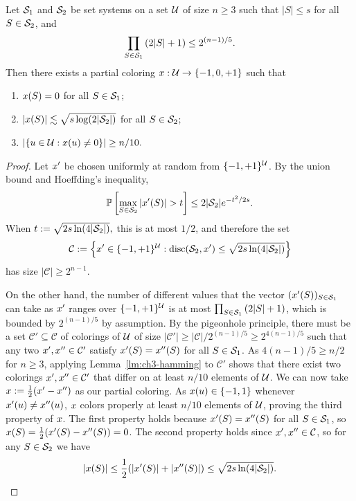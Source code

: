 \begin{lemma}\label{lm:ch3-beck}
  Let $\mathcal{S}_1$ and $\mathcal{S}_2$ be set systems on a set $\mathcal{U}$ of size $n
  \ge 3$
  such that  $|S| \le s$ for all $S \in \mathcal{S}_2$, and
  \[
  \prod_{S \in \mathcal{S}_1}{(2|S| + 1)} \le 2^{(n-1)/5}.
  \]
  Then there exists a {partial coloring} $x:\mathcal{U} \to \{-1, 0, +1\}$
  such that
  \begin{enumerate}
  \item $x(S) = 0$ for all $S\in \mathcal{S}_1$;
  \item $|x(S)| \lesssim \sqrt{s \log(2|\mathcal{S}_2|)}$ for
    all $S \in \mathcal{S}_2$;
  \item \(|\{u \in \mathcal{U}: x(u) \neq 0\}| \ge n/10.\)
  \end{enumerate}
  \end{lemma}
\begin{proof}
  Let $x'$ be chosen uniformly at random from $\{-1, +1\}^{\mathcal{U}}$. By the union bound and Hoeffding's inequality,
  \[
    \mathbb{P}\left[\max_{S \in \mathcal{S}_2} |x'(S)| > t \right]
    \le 2|\mathcal{S}_2| e^{-t^2/2s}.
  \]
  When \(t := \sqrt{2s \ln(4|\mathcal{S}_2|)},\) this is at most $1/2$, and therefore the set
  \[
    \mathcal{C} := \left\{x'\in \{-1,+1\}^{\mathcal{U}} : \operatorname{disc}(\mathcal{S}_2,x')\le \sqrt{2s \ln(4|\mathcal{S}_2|)}\right\}
  \]
  has size $|\mathcal{C}| \ge 2^{n-1}$. 

  On the other hand, the number of different values that the vector
  $(x'(S))_{S \in \mathcal{S}_1}$ can take as \(x'\) ranges over
  \(\{-1,+1\}^{\mathcal{U}}\) is at most $\prod_{S \in
    \mathcal{S}_1}{(2|S| + 1)}$, which is bounded by $2^{(n-1)/5}$ by
  assumption. 
  By the pigeonhole
  principle, there must be a set $\mathcal{C}' \subseteq \mathcal{C}$
  of colorings of $\mathcal{U}$ of size  $|\mathcal{C}'| \ge
|\mathcal{C}|/2^{(n-1)/5} \ge 2^{4(n-1)/5}$ such that any two
  $x', x'' \in \mathcal{C}'$ satisfy $x'(S) = x''(S)$ for
  all $S\in \mathcal{S}_1$. As \(4(n-1)/5 \ge n/2\) for \(n
  \ge 3\), applying Lemma~\ref{lm:ch3-hamming} to \(\mathcal{C}'\)
  shows that there exist two colorings \(x',x''\in
  \mathcal{C}'\) that differ on at least
  \(n/10\) elements of \(\mathcal{U}\). 
  We can now take $x := \frac12(x' - x'')$ as our
  partial coloring. As \(x(u) \in \{-1,1\} \) whenever \(x'(u)
  \neq x''(u)\), \(x\) colors properly at least
  \(n/10\) elements of \(\mathcal{U}\), proving the third property of \(x\). The
  first property holds because \(x'(S) = x''(S)\) for all \(S
  \in \mathcal{S}_1\), so \(x(S) = \frac12(x'(S) - x''(S)) = 0\). The
  second property holds since \(x',x''\in \mathcal{C}\), so for
  any \(S \in \mathcal{S}_2\) we have
  \[
    |x(S)| \le \frac12(|x'(S)| + |x''(S)|) \le \sqrt{2s \ln(4|\mathcal{S}_2|)}. \qedhere
  \]
\end{proof}


